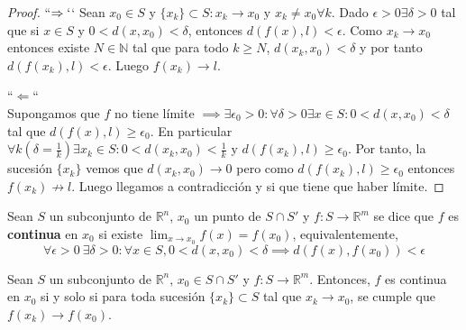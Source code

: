 \begin{proof}
    ``$\Rightarrow`$`
    Sean $x_0 \in S$ y $\{x_k\} \subset S : x_k \to x_0 \text{ y } x_k \neq x_0 \forall k$. Dado $\epsilon > 0 \exists \delta > 0$ tal que si $x \in S$ y $0 < d(x, x_0) < \delta$, entonces $d(f(x), l) < \epsilon$. Como $x_k \to x_0$ entonces existe $N \in \mathbb{N}$ tal que para todo $k \geq N$, $d(x_k, x_0) < \delta$ y por tanto $d(f(x_k), l) < \epsilon$. Luego \( f(x_k) \to l \).

    ``$\Leftarrow$`` \\
    Supongamos que $f$ no tiene límite $\implies \exists \epsilon_0 > 0 : \forall \delta > 0 \exists x \in S : 0 < d(x, x_0) < \delta$ tal que $d(f(x), l) \geq \epsilon_0$. En particular $\forall k (\delta = \frac{1}{k}) \exists x_k \in S : 0 < d(x_k, x_0) < \frac{1}{k} \text{ y } d(f(x_k), l) \geq \epsilon_0$. Por tanto, la sucesión \( \{x_k\} \) vemos que $d(x_k, x_0) \to 0$ pero como $d(f(x_k), l) \geq \epsilon_0$ entonces \( f(x_k) \not\to l \). Luego llegamos a contradicción y si que tiene que haber límite. 
\end{proof}

\begin{definición}[Continuidad]
    Sean $S$ un subconjunto de $\mathbb{R}^n$, $x_0$ un punto de $S \cap S'$ y $f: S \to \mathbb{R}^m$ se dice que $f$ es \textbf{continua} en $x_0$ si existe $\lim_{x \to x_0} f(x) = f(x_0)$, equivalentemente,
    $$\forall \epsilon > 0 \ \exists \delta > 0 : \forall x \in S, 0 < d(x, x_0) < \delta \implies d(f(x), f(x_0)) < \epsilon$$
\end{definición}

\begin{teorema}
    Sean $S$ un subconjunto de $\mathbb{R}^n$, $x_0 \in S \cap S'$ y $f: S \to \mathbb{R}^m$. Entonces, $f$ es continua en $x_0$ si y solo si para toda sucesión \( \{x_k\} \subset S \) tal que \( x_k \to x_0 \), se cumple que \( f(x_k) \to f(x_0) \).
\end{teorema}

